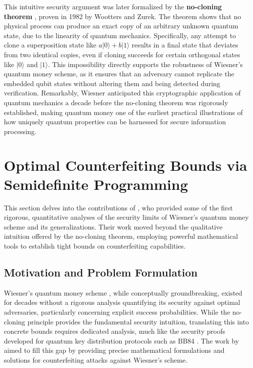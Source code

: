 \documentclass{article} %
\begin{document}
This intuitive security argument was later formalized by the \textbf{no-cloning theorem} \citep{WoottersZurek1982Single}, proven in 1982 by Wootters and Zurek. The theorem shows that no physical process can produce an exact copy of an arbitrary unknown quantum state, due to the linearity of quantum mechanics. Specifically, any attempt to clone a superposition state like $a|0\rangle + b|1\rangle$ results in a final state that deviates from two identical copies, even if cloning succeeds for certain orthogonal states like $|0\rangle$ and $|1\rangle$. This impossibility directly supports the robustness of Wiesner’s quantum money scheme, as it ensures that an adversary cannot replicate the embedded qubit states without altering them and being detected during verification. Remarkably, Wiesner anticipated this cryptographic application of quantum mechanics a decade before the no-cloning theorem was rigorously established, making quantum money one of the earliest practical illustrations of how uniquely quantum properties can be harnessed for secure information processing.

\color{black}
\newpage
\section{Optimal Counterfeiting Bounds via Semidefinite Programming}
This section delves into the contributions of \citet{Molina2012Optimal}, who provided some of the first rigorous, quantitative analyses of the security limits of Wiesner's quantum money scheme and its generalizations. Their work moved beyond the qualitative intuition offered by the no-cloning theorem, employing powerful mathematical tools to establish tight bounds on counterfeiting capabilities.

\subsection{Motivation and Problem Formulation}

Wiesner's quantum money scheme \citep{Wiesner1983Conjugate}, while conceptually groundbreaking, existed for decades without a rigorous analysis quantifying its security against optimal adversaries, particularly concerning explicit success probabilities. While the no-cloning principle \citep{WoottersZurek1982Single} provides the fundamental security intuition, translating this into concrete bounds requires dedicated analysis, much like the security proofs developed for quantum key distribution protocols such as BB84 \citep{BennettBrassard1984Quantum, ShorPreskill2000Simple}. The work by \citet{Molina2012Optimal} aimed to fill this gap by providing precise mathematical formulations and solutions for counterfeiting attacks against Wiesner's scheme.
\end{document}
